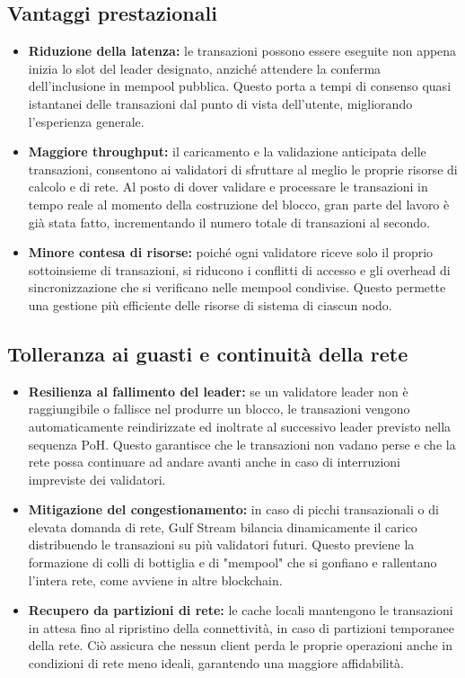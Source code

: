 \documentclass[a4paper,12pt]{report}
\begin{document}
	\subsection{Vantaggi prestazionali}
	\begin{itemize}
		\item \textbf{Riduzione della latenza:} le transazioni possono essere eseguite non appena inizia lo slot del leader designato, anziché attendere la conferma dell’inclusione in mempool pubblica. Questo porta a tempi di consenso quasi istantanei delle transazioni dal punto di vista dell'utente, migliorando l'esperienza generale.
		\item \textbf{Maggiore throughput:} il caricamento e la validazione anticipata delle transazioni, consentono ai validatori di sfruttare al meglio le proprie risorse di calcolo e di rete. Al posto di dover validare e processare le transazioni in tempo reale al momento della costruzione del blocco, gran parte del lavoro è già stata fatto, incrementando il numero totale di transazioni al secondo.
		\item \textbf{Minore contesa di risorse:} poiché ogni validatore riceve solo il proprio sottoinsieme di transazioni, si riducono i conflitti di accesso e gli overhead di sincronizzazione che si verificano nelle mempool condivise. Questo permette una gestione più efficiente delle risorse di sistema di ciascun nodo.
	\end{itemize}
	
	\subsection{Tolleranza ai guasti e continuità della rete}
	\begin{itemize}
		\item \textbf{Resilienza al fallimento del leader:} se un validatore leader non è raggiungibile o fallisce nel produrre un blocco, le transazioni vengono automaticamente reindirizzate ed inoltrate al successivo leader previsto nella sequenza PoH. Questo garantisce che le transazioni non vadano perse e che la rete possa continuare ad andare avanti anche in caso di interruzioni impreviste dei validatori.
		\item \textbf{Mitigazione del congestionamento:} in caso di picchi transazionali o di elevata domanda di rete, Gulf Stream bilancia dinamicamente il carico distribuendo le transazioni su più validatori futuri. Questo previene la formazione di colli di bottiglia e di "mempool" che si gonfiano e rallentano l'intera rete, come avviene in altre blockchain.
		\item \textbf{Recupero da partizioni di rete:} le cache locali mantengono le transazioni in attesa fino al ripristino della connettività, in caso di partizioni temporanee della rete. Ciò assicura che nessun client perda le proprie operazioni anche in condizioni di rete meno ideali, garantendo una maggiore affidabilità.
	\end{itemize}
	
\end{document}
